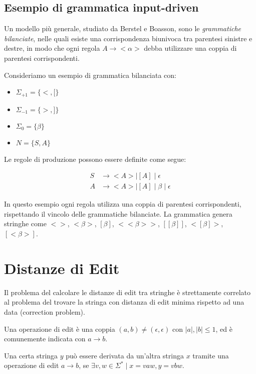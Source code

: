 \documentclass[a4paper,12pt]{report}
\theoremstyle{propositionstyle}
\begin{document}
    \subsection{Esempio di grammatica input-driven}

    Un modello più generale, studiato da Berstel e Boasson, sono le \textit{grammatiche bilanciate}, nelle quali esiste una corrispondenza biunivoca tra parentesi sinistre e destre, in modo che ogni regola $A \rightarrow <\alpha>$ debba utilizzare una coppia di parentesi corrispondenti.

    Consideriamo un esempio di grammatica bilanciata con:
    \begin{itemize}
        \item $\Sigma_{+1} = \{<, [\}$
        \item $\Sigma_{-1} = \{>, ]\}$
        \item $\Sigma_0 = \{\beta\}$
        \item $N = \{S, A\}$
    \end{itemize}

    Le regole di produzione possono essere definite come segue:

    \begin{align}
        S &\rightarrow < A > \mid [A] \mid \epsilon \\
        A &\rightarrow < A > \mid [A] \mid \beta \mid \epsilon
    \end{align}

    In questo esempio ogni regola utilizza una coppia di parentesi corrispondenti, rispettando il vincolo delle grammatiche bilanciate. La grammatica genera stringhe come $<>$, $<\beta>$, $[\beta]$, $<<\beta>>$, $[[\beta]]$, $<[\beta]>$, $[<\beta>]$.


    \section{Distanze di Edit}

    Il problema del calcolare le distanze di edit tra stringhe è strettamente correlato al problema del trovare la stringa con distanza di edit minima rispetto ad una data (correction problem).

    Una operazione di edit è una coppia $(a, b) \neq (\epsilon, \epsilon)$ con $|a|, |b| \leq 1$, ed è comunemente indicata con $a \rightarrow b$.

    Una certa stringa $y$ può essere derivata da un'altra stringa $x$ tramite una operazione di edit $a \rightarrow b$, se $\exists v, w \in \Sigma^* \mid x = vaw, y = vbw$.
\end{document}
